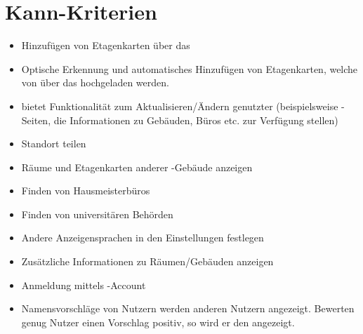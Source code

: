 \section{Kann-Kriterien}

\begin{itemize}

    \item Hinzufügen von Etagenkarten über das %
    
    \item Optische Erkennung und automatisches Hinzufügen von Etagenkarten,
     welche von %
     über das %
      hochgeladen werden.
    \item %
     bietet Funktionalität zum Aktualisieren/Ändern genutzter %
      (beispielsweise %
     -Seiten, die Informationen zu Gebäuden, Büros etc. zur Verfügung stellen)
    \item Standort teilen 
    \item Räume und Etagenkarten anderer %
    -Gebäude anzeigen
    \item Finden von Hausmeisterbüros
    \item Finden von universitären Behörden
    \item Andere Anzeigensprachen in den Einstellungen festlegen
    \item Zusätzliche Informationen zu Räumen/Gebäuden anzeigen
    \item Anmeldung mittels %
    -Account
    \item Namensvorschläge von Nutzern werden anderen Nutzern angezeigt. Bewerten genug Nutzer einen 
    Vorschlag positiv, so wird er den %
     angezeigt.
    
        

\end{itemize}
